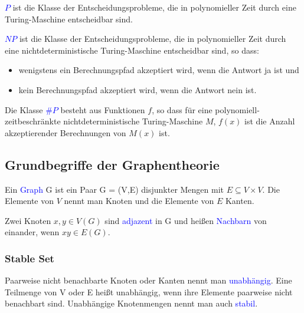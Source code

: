 \begin{definition}
\textcolor{blue}{$P$} ist die Klasse der Entscheidungsprobleme, die in polynomieller Zeit durch eine Turing-Maschine entscheidbar sind.
\end{definition}

\begin{definition}
\textcolor{blue}{$NP$} ist die Klasse der Entscheidungsprobleme, die in polynomieller Zeit durch eine nichtdeterministische Turing-Maschine entscheidbar sind, so dass:
\begin{itemize}
\item wenigstens ein Berechnungspfad akzeptiert wird, wenn die Antwort \glqq ja\grqq{}  ist und
\item kein Berechnungspfad akzeptiert wird, wenn die Antwort \glqq nein\grqq{} ist.
\end{itemize}
\end{definition}

\begin{definition}
Die Klasse \textcolor{blue}{$\#P$} besteht aus Funktionen $f$, so dass für eine polynomiell-zeitbeschränkte nichtdeterministische Turing-Maschine $M$, $f(x)$ ist die Anzahl akzeptierender Berechnungen von $M(x)$ ist.
\end{definition}


\subsection{Grundbegriffe der Graphentheorie} 

\begin{definition}
Ein \textcolor{blue}{Graph} G ist ein Paar G = (V,E) disjunkter Mengen mit $E \subseteq V\times V$. Die Elemente von $V$ nennt man Knoten und die Elemente von $E$ Kanten. \cite{Diestel}
\end{definition}

\begin{definition}
Zwei Knoten $x,y \in V(G)$ sind \textcolor{blue}{adjazent} in G und heißen \textcolor{blue}{Nachbarn} von einander, wenn $xy \in E(G)$. \cite{Diestel}
\end{definition}

\subsubsection*{Stable Set}

\begin{definition}
Paarweise nicht benachbarte Knoten oder Kanten nennt man \textcolor{blue}{unabhängig}. Eine Teilmenge von V oder E heißt unabhängig, wenn ihre Elemente paarweise nicht benachbart sind. Unabhängige Knotenmengen nennt man auch \textcolor{blue}{stabil}. \cite{Diestel}
\end{definition}


